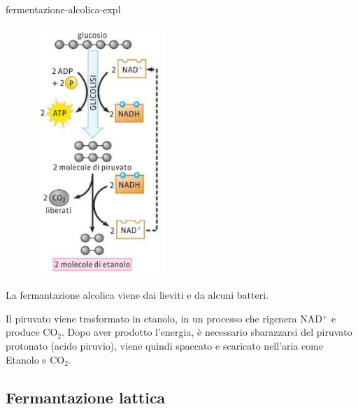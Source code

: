 \documentclass[preview]{standalone}
\begin{document}
\begin{snippet}{fermentazione-alcolica-expl}
    \setlength{\intextsep}{0pt}%
    \begin{figure}
        \includegraphics[width=5cm]{./resources/fermentazione-alcolica.png}
    \end{figure}
    La fermantazione alcolica viene dai lieviti e da alcuni batteri.
    
    Il piruvato viene trasformato in etanolo, in un processo che rigenera NAD\({}^+\) e produce CO\({}_2\).
    Dopo aver prodotto l'energia, è necessario sbarazzarsi del piruvato protonato (acido piruvio),
    viene quindi spaccato e scaricato nell'aria come Etanolo e CO\({}_2\).
    \wrapfill
\end{snippet}

\subsection{Fermantazione lattica}
\end{document}
